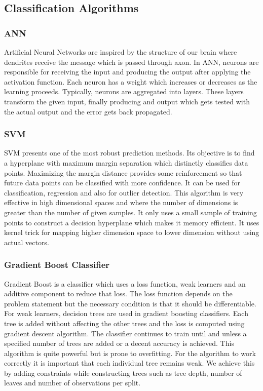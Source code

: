 \subsection{Classification Algorithms}
\label{subsection:classificationAlgos}

\subsubsection{ANN}
\label{subsubsection:ann}
Artificial Neural Networks are inspired by the structure of our brain where dendrites receive the message which is passed through axon\cite{book:ann}. In ANN, neurons are responsible for receiving the input and producing the output after applying the activation function. Each neuron has a weight which increases or decreases as the learning proceeds. Typically, neurons are aggregated into layers. These layers transform the given input, finally producing and output which gets tested with the actual output and the error gets back propagated. 

\subsubsection{SVM}
\label{subsubsection:svm}
SVM presents one of the most robust prediction methods\cite{article:svm}. Its objective is to find a hyperplane with maximum margin separation which distinctly classifies data points. Maximizing the margin distance provides some reinforcement so that future data points can be classified with more confidence. It can be used for classification, regression and also for outlier detection. This algorithm is very effective in high dimensional spaces and where the number of dimensions is greater than the number of given samples. It only uses a small sample of training points to construct a decision hyperplane which makes it memory efficient. It uses kernel trick for mapping higher dimension space to lower dimension without using actual vectors.

\subsubsection{Gradient Boost Classifier}
\label{subsubsection:gradientBoost}
Gradient Boost is a classifier which uses a loss function, weak learners and an additive component to reduce that loss\cite{article:gradientBoosting}. The loss function depends on the problem statement but the necessary condition is that it should be differentiable. For weak learners, decision trees are used in gradient boosting classifiers. Each tree is added without affecting the other trees and the loss is computed using gradient descent algorithm. The classifier continues to train until and unless a specified number of trees are added or a decent accuracy is achieved. This algorithm is quite powerful but is prone to overfitting. For the algorithm to work correctly it is important that each individual tree remains weak. We achieve this by adding constraints while constructing trees such as tree depth, number of leaves and number of observations per split.

